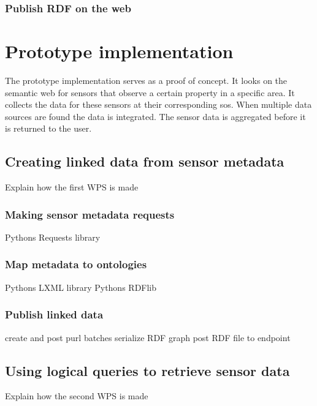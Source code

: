 
\subsection{Publish RDF on the web}


\chapter{Prototype implementation}
The prototype implementation serves as a proof of concept. It looks on the semantic web for sensors that observe a certain property in a specific area. It collects the data for these sensors at their corresponding \acl{sos}. When multiple data sources are found the data is integrated. The sensor data is aggregated before it is returned to the user.

\section{Creating linked data from sensor metadata}

Explain how the first WPS is made 

\subsection{Making sensor metadata requests}
Pythons Requests library

\subsection{Map metadata to ontologies}
Pythons LXML library
Pythons RDFlib

\subsection{Publish linked data}
create and post purl batches
serialize RDF graph
post RDF file to endpoint


\section{Using logical queries to retrieve sensor data}

Explain how the second WPS is made 

